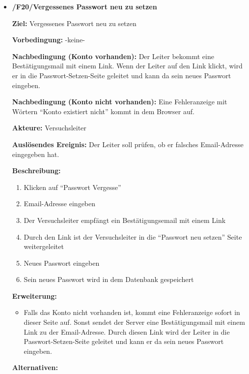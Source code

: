 \documentclass[a4paper]{scrreprt}
\begin{document}
\begin{itemize}
	            \item \textbf{/F20/Vergessenes Passwort neu zu setzen}
	
	            \par \textbf{Ziel: }Vergessenes Passwort neu zu setzen
	            \par \textbf{Vorbedingung: }-keine-
	            \par \textbf{Nachbedingung (Konto vorhanden): }Der Leiter bekommt eine Bestätigungsmail mit einem Link. Wenn der Leiter auf den Link klickt, wird er in die Passwort-Setzen-Seite geleitet und kann da sein neues Passwort eingeben.
	            \par \textbf{Nachbedingung (Konto nicht vorhanden): }Eine Fehleranzeige mit Wörtern ``Konto existiert nicht'' kommt in dem Browser auf.
	            \par \textbf{Akteure: }Versuchsleiter
	            \par \textbf{Auslösendes Ereignis: }Der Leiter soll prüfen, ob er falsches Email-Adresse eingegeben hat.
	            \par \textbf{Beschreibung: }
	            \begin{enumerate}
	            	\item Klicken auf ``Passwort Vergesse''
	            	\item Email-Adresse eingeben
	            	\item Der Versuchsleiter empfängt ein Bestätigungsemail mit einem Link
	            	\item Durch den Link ist der Versuchsleiter in die “Passwort neu setzen” Seite weitergeleitet
	            	\item Neues Passwort eingeben
	            	\item Sein neues Passwort wird in dem Datenbank gespeichert
            	\end{enumerate}
	            \par \textbf{Erweiterung: }
	            \begin{itemize}
		            \item Falls das Konto nicht vorhanden ist, kommt eine Fehleranzeige sofort in dieser Seite auf. Sonst sendet der Server eine Bestätigungsmail mit einem Link zu der Email-Adresse. Durch diesen Link wird der Leiter in die Passwort-Setzen-Seite geleitet und kann er da sein neues Passwort eingeben.
	            \end{itemize}
	            \par \textbf{Alternativen: }
	

\end{itemize}
\end{document}
